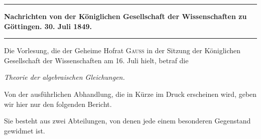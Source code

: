 \clearpage
{}
\par\noindent\hfill\rule{0.30\linewidth}{0.4pt}\hfill\mbox{}\par
\begin{center}
\textbf{Nachrichten von der Königlichen Gesellschaft der Wissenschaften zu Göttingen. 30. Juli 1849.}
\end{center}

\par\noindent\hfill\rule{0.30\linewidth}{0.4pt}\hfill\mbox{}\par

Die Vorlesung, die der Geheime Hofrat \textsc{Gauss} in der Sitzung der Königlichen Gesellschaft der Wissenschaften am 16. Juli hielt, betraf die
\begin{center}
\textit{Theorie der algebraischen Gleichungen.}
\end{center}
Von der ausführlichen Abhandlung, die in Kürze im Druck erscheinen wird, geben wir hier nur den folgenden Bericht.

Sie besteht aus zwei Abteilungen, von denen jede einem besonderen Gegenstand gewidmet ist.

